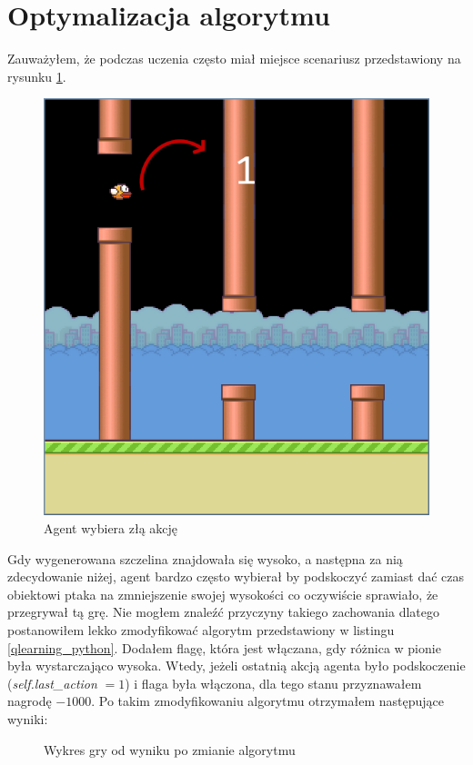 \documentclass[a4paper, 12pt,oneside]{book}
\begin{document}
\section{Optymalizacja algorytmu}
Zauważyłem, że podczas uczenia często miał miejsce scenariusz przedstawiony na
rysunku \ref{agent_top_pipe}.
\begin{figure}[!htb]
	\begin{center}
		\includegraphics[scale=0.40]{agent_top_pipe_penalty.png}
	\end{center}
	\caption{Agent wybiera złą akcję}
	\label{agent_top_pipe}
\end{figure}
Gdy wygenerowana szczelina znajdowała się wysoko, a następna za nią
zdecydowanie niżej, agent bardzo często wybierał by podskoczyć zamiast dać czas
obiektowi ptaka na zmniejszenie swojej wysokości co oczywiście sprawiało,
że przegrywał tą grę. Nie mogłem znaleźć przyczyny takiego zachowania dlatego
postanowiłem lekko zmodyfikować algorytm przedstawiony w listingu
\ref{qlearning_python}. Dodałem flagę, która jest włączana, gdy różnica w
pionie była wystarczająco wysoka. Wtedy, jeżeli ostatnią akcją agenta było
podskoczenie (\textit{self.last\_action} $=1$) i flaga była włączona, dla tego
stanu przyznawałem nagrodę $-1000$. Po takim zmodyfikowaniu algorytmu
otrzymałem następujące wyniki:
\begin{figure}[!htb]
	\begin{center}
		
	\end{center}
	\caption{Wykres gry od wyniku po zmianie algorytmu}
	\label{plot_top_pipe_penalty}
\end{figure}
\end{document}

